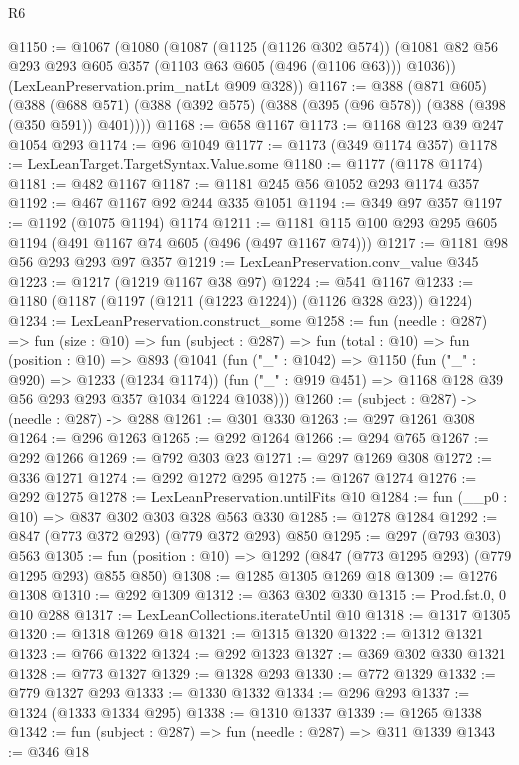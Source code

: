 \begin{lexlean}{R6}
\begin{coremodule}
@1150 := @1067
    (@1080
      (@1087
        (@1125 (@1126 @302 @574))
        (@1081 @82 @56 @293 @293 @605 @357 (@1103 @63 @605 (@496 (@1106 @63))) @1036))
      (LexLeanPreservation.prim_natLt @909 @328))
@1167 := @388
    (@871 @605)
    (@388 (@688 @571) (@388 (@392 @575) (@388 (@395 (@96 @578)) (@388 (@398 (@350 @591)) @401))))
@1168 := @658 @1167
@1173 := @1168 @123 @39 @247 @1054 @293
@1174 := @96 @1049
@1177 := @1173 (@349 @1174 @357)
@1178 := LexLeanTarget.TargetSyntax.Value.some
@1180 := @1177 (@1178 @1174)
@1181 := @482 @1167
@1187 := @1181 @245 @56 @1052 @293 @1174 @357
@1192 := @467 @1167 @92 @244 @335 @1051
@1194 := @349 @97 @357
@1197 := @1192 (@1075 @1194) @1174
@1211 := @1181 @115 @100 @293 @295 @605 @1194 (@491 @1167 @74 @605 (@496 (@497 @1167 @74)))
@1217 := @1181 @98 @56 @293 @293 @97 @357
@1219 := LexLeanPreservation.conv_value @345
@1223 := @1217 (@1219 @1167 @38 @97)
@1224 := @541 @1167
@1233 := @1180 (@1187 (@1197 (@1211 (@1223 @1224)) (@1126 @328 @23)) @1224)
@1234 := LexLeanPreservation.construct_some
@1258 := fun (needle : @287) =>
  fun (size : @10) =>
  fun (subject : @287) =>
  fun (total : @10) =>
  fun (position : @10) =>
  @893
    (@1041
      (fun ("_" : @1042) =>
      @1150
        (fun ("_" : @920) => @1233 (@1234 @1174))
        (fun ("_" : @919 @451) => @1168 @128 @39 @56 @293 @293 @357 @1034 @1224 @1038)))
@1260 := (subject : @287) -> (needle : @287) -> @288
@1261 := @301 @330
@1263 := @297 @1261 @308
@1264 := @296 @1263
@1265 := @292 @1264
@1266 := @294 @765
@1267 := @292 @1266
@1269 := @792 @303 @23
@1271 := @297 @1269 @308
@1272 := @336 @1271
@1274 := @292 @1272 @295
@1275 := @1267 @1274
@1276 := @292 @1275
@1278 := LexLeanPreservation.untilFits @10
@1284 := fun (__p0 : @10) => @837 @302 @303 @328 @563 @330
@1285 := @1278 @1284
@1292 := @847 (@773 @372 @293) (@779 @372 @293) @850
@1295 := @297 (@793 @303) @563
@1305 := fun (position : @10) => @1292 (@847 (@773 @1295 @293) (@779 @1295 @293) @855 @850)
@1308 := @1285 @1305 @1269 @18
@1309 := @1276 @1308
@1310 := @292 @1309
@1312 := @363 @302 @330
@1315 := Prod.fst.{0, 0} @10 @288
@1317 := LexLeanCollections.iterateUntil @10
@1318 := @1317 @1305
@1320 := @1318 @1269 @18
@1321 := @1315 @1320
@1322 := @1312 @1321
@1323 := @766 @1322
@1324 := @292 @1323
@1327 := @369 @302 @330 @1321
@1328 := @773 @1327
@1329 := @1328 @293
@1330 := @772 @1329
@1332 := @779 @1327 @293
@1333 := @1330 @1332
@1334 := @296 @293
@1337 := @1324 (@1333 @1334 @295)
@1338 := @1310 @1337
@1339 := @1265 @1338
@1342 := fun (subject : @287) => fun (needle : @287) => @311 @1339
@1343 := @346 @18

\end{coremodule}
\end{lexlean}
